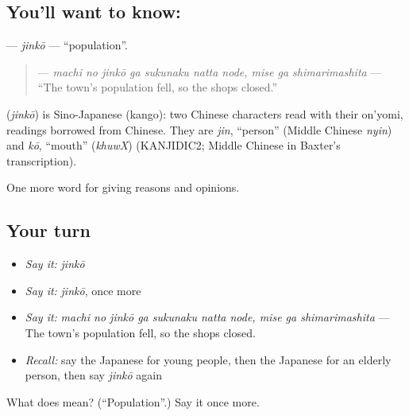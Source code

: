 \subsection*{You'll want to know: }
\textbf{} — \emph{jinkō} — \textquotedblleft{}population\textquotedblright{}.

\begin{quote}
\textbf{    } — \emph{machi no jinkō ga sukunaku natta node, mise ga shimarimashita} — \textquotedblleft{}The town's population fell, so the shops closed.\textquotedblright{}
\end{quote}

\begin{cousinweb}
\textbf{} (\emph{jinkō}) is Sino-Japanese (kango): two Chinese characters read with their on'yomi, readings borrowed from Chinese. They are \emph{jin}, \textquotedblleft{}person\textquotedblright{} (Middle Chinese \emph{nyin}) and \emph{kō}, \textquotedblleft{}mouth\textquotedblright{} (\emph{khuwX}) (KANJIDIC2; Middle Chinese in Baxter's transcription).
\end{cousinweb}

\begin{grammarlens}[title={What you've built}]
One more word for giving reasons and opinions.
\end{grammarlens}

\subsection*{Your turn}
\begin{itemize}
\raggedright
  \item \emph{Say it:} \emph{jinkō}
  \item \emph{Say it:} \emph{jinkō}, once more
  \item \emph{Say it:} \emph{machi no jinkō ga sukunaku natta node, mise ga shimarimashita} — The town's population fell, so the shops closed.
  \item \emph{Recall:} say the Japanese for young people, then the Japanese for an elderly person, then say \emph{jinkō} again
\end{itemize}

\begin{tcolorbox}[breakable,colback=teal!4,colframe=teal!35!black,title={Before you move on}]
What does  mean? (\textquotedblleft{}Population\textquotedblright{}.) Say it once more.
\end{tcolorbox}
